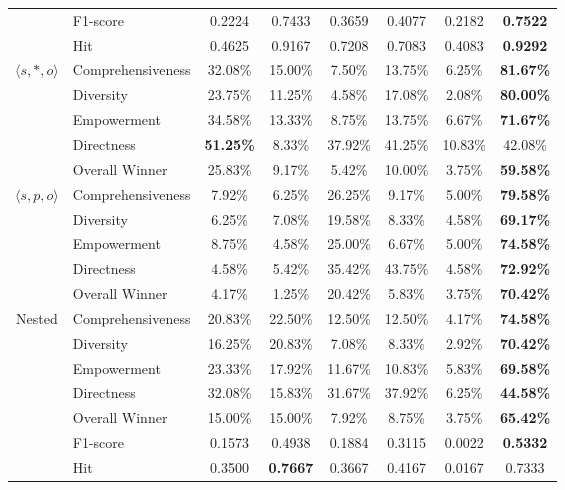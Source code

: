 \begin{table}[t!]
{\begin{tabular}{@{}clcccccc@{}}
 & F1-score & 0.2224 & 0.7433 & 0.3659 & 0.4077 & 0.2182 & \textbf{0.7522} \\
 & Hit & 0.4625 & 0.9167 & 0.7208 & 0.7083 & 0.4083 & \textbf{0.9292} \\ \midrule
\multirow{5}{*}{$\langle s,*,o \rangle $} & Comprehensiveness & 32.08\% & 15.00\% & 7.50\% & 13.75\% & 6.25\% & \textbf{81.67\%} \\
& Diversity & 23.75\% & 11.25\% & 4.58\% & 17.08\% & 2.08\% & \textbf{80.00\%} \\
& Empowerment & 34.58\% & 13.33\% & 8.75\% & 13.75\% & 6.67\% & \textbf{71.67\%} \\
& Directness & \textbf{51.25\%} & 8.33\% & 37.92\% & 41.25\% & 10.83\% & 42.08\% \\
& Overall Winner & 25.83\% & 9.17\% & 5.42\% & 10.00\% & 3.75\% & \textbf{59.58\%} \\ \midrule
\multirow{5}{*}{$\langle s,p,o \rangle $} & Comprehensiveness & 7.92\% & 6.25\% & 26.25\% & 9.17\% & 5.00\% & \textbf{79.58\%} \\
 & Diversity & 6.25\% & 7.08\% & 19.58\% & 8.33\% & 4.58\% & \textbf{69.17\%} \\
 & Empowerment & 8.75\% & 4.58\% & 25.00\% & 6.67\% & 5.00\% & \textbf{74.58\%} \\
 & Directness & 4.58\% & 5.42\% & 35.42\% & 43.75\% & 4.58\% & \textbf{72.92\%} \\
 & Overall Winner & 4.17\% & 1.25\% & 20.42\% & 5.83\% & 3.75\% & \textbf{70.42\%} \\ \midrule
\multirow{8}{*}{Nested} & Comprehensiveness & 20.83\% & 22.50\% & 12.50\% & 12.50\% & 4.17\% & \textbf{74.58\%} \\
 & Diversity & 16.25\% & 20.83\% & 7.08\% & 8.33\% & 2.92\% & \textbf{70.42\%} \\
 & Empowerment & 23.33\% & 17.92\% & 11.67\% & 10.83\% & 5.83\% & \textbf{69.58\%} \\
 & Directness & 32.08\% & 15.83\% & 31.67\% & 37.92\% & 6.25\% & \textbf{44.58\%} \\
 & Overall Winner & 15.00\% & 15.00\% & 7.92\% & 8.75\% & 3.75\% & \textbf{65.42\%} \\ \cmidrule(l){2-8}
 & F1-score & 0.1573 & 0.4938 & 0.1884 & 0.3115 & 0.0022 & \textbf{0.5332} \\
 & Hit & 0.3500 & \textbf{0.7667} & 0.3667 & 0.4167 & 0.0167 & 0.7333 \\ \bottomrule
\end{tabular}%
}
\end{table}

